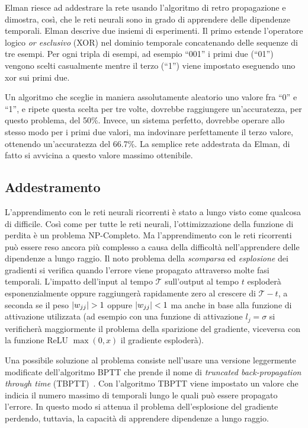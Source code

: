 Elman riesce ad addestrare la rete usando l'algoritmo di retro propagazione e
dimostra, cos\`i, che le reti neurali sono in grado di apprendere delle dipendenze
temporali. Elman descrive due insiemi di esperimenti. Il primo estende l'operatore
logico \emph{or esclusivo} (XOR) nel dominio temporale concatenando delle sequenze
di tre esempi. Per ogni tripla di esempi, ad esempio ``001'' i primi due (``01'')
vengono scelti casualmente mentre il terzo (``1'') viene impostato eseguendo uno
xor sui primi due.

Un algoritmo che sceglie in maniera assolutamente aleatorio uno valore fra ``0''
e ``1'', e ripete questa scelta per tre volte, dovrebbe raggiungere un'accuratezza,
per questo problema, del 50\%. Invece, un sistema perfetto, dovrebbe operare allo
stesso modo per i primi due valori, ma indovinare perfettamente il terzo valore,
ottenendo un'accuratezza del 66.7\%. La semplice rete addestrata da Elman, di fatto
si avvicina a questo valore massimo ottenibile.

\subsection{Addestramento}
L'apprendimento con le reti neurali ricorrenti \`e stato a lungo visto come qualcosa di difficile.
Cos\`i come per tutte le reti neurali, l'ottimizzazione della funzione di perdita \`e un problema NP-Completo.
Ma l'apprendimento con le reti ricorrenti pu\`o essere reso ancora pi\`u complesso a causa della difficolt\`a nell'apprendere delle dipendenze a lungo raggio.
Il noto problema della \emph{scomparsa} ed \emph{esplosione} dei gradienti si verifica quando l'errore viene propagato attraverso molte fasi temporali.
 L'impatto dell'input al tempo $\mathcal{T}$ sull'output al tempo $t$ esploder\`a esponenzialmente oppure raggiunger\`a rapidamente zero al crescere di $\mathcal{T} - t$, a seconda se il peso $\lvert w_{jj}\rvert>1$ oppure $\lvert w_{jj}\rvert<1$ ma anche in base alla funzione di attivazione utilizzata
(ad esempio con una funzione di attivazione $l_j = \sigma$ si verificher\`a maggiormente il problema della sparizione del gradiente, viceversa con la funzione ReLU $\operatorname{max}(0, x)$ il gradiente esploder\`a).

Una possibile soluzione al problema consiste nell'usare una versione leggermente modificate dell'algoritmo BPTT che prende il nome di \emph{truncated back-propagation through time} (TBPTT)~\cite{Williams:1989}.
Con l'algoritmo TBPTT viene impostato un valore che indicia il numero massimo di temporali lungo le quali pu\`o essere propagato l'errore.
In questo modo si attenua il problema dell'esplosione del gradiente perdendo, tuttavia, la capacit\`a di apprendere dipendenze a lungo raggio.

